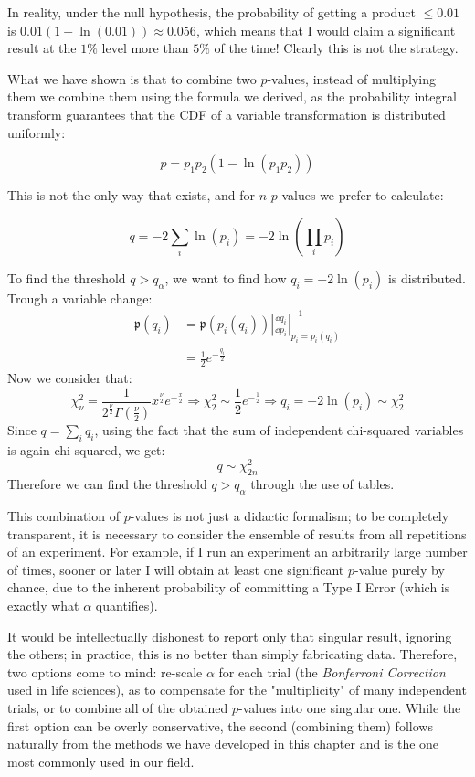 In reality, under the null hypothesis, the probability of getting a product $\leq 0.01$ is $0.01(1 - \ln(0.01)) \approx 0.056$, which means that I would claim a significant result at the $1\%$ level more than $5\%$ of the time! Clearly this is not the strategy.

What we have shown is that to combine two $p$-values, instead of multiplying them we combine them using the formula we derived, as the probability integral transform guarantees that the CDF of a variable transformation is distributed uniformly:

	\[
	p = p_1p_2 (1 - \ln(p_1p_2))
	\tag{Combination of two $p$-values}
	\]
	

This is not the only way that exists, and for $n$ $p$-values we prefer to calculate:

	\[
	q=-2\sum_i\ln\left(p_i\right) = -2\ln\left(\prod_i p_i\right)
	\]

To find the threshold $q>q_\alpha$, we want to find how $q_i=-2\ln\left(p_i\right)$ is distributed. Trough a variable change:
\begin{align*}
	\mathfrak{p}(q_i)&=\mathfrak{p}(p_i(q_i))\left|\frac{\dd q_i}{\dd p_i}\right|^{-1}_{p_i=p_i(q_i)}\\
	&=\frac{1}{2}e^{-\frac{q_i}{2}}
\end{align*}
Now we consider that:
	\[
	\chi^2_\nu = \frac{1}{2^{\frac{\nu}{2}}\Gamma\left(\frac{\nu}{2}\right)}x^{\frac{\nu}{2}}e^{-\frac{x}{2}} \Rightarrow \chi_2^2 \sim \frac{1}{2}e^{-\frac{1}{2}} \Rightarrow q_i=-2\ln\left(p_i\right) \sim \chi_2^2
	\]
Since $q=\sum_iq_i$, using the fact that the sum of independent chi-squared variables is again chi-squared, we get:
\[
	q\sim\chi^2_{2n}
\]
Therefore we can find the threshold $q>q_\alpha$ through the use of tables.

This combination of $p$-values is not just a didactic formalism; to be completely transparent, it is necessary to consider the ensemble of results from all repetitions of an experiment. For example, if I run an experiment an arbitrarily large number of times, sooner or later I will obtain at least one significant $p$-value purely by chance, due to the inherent probability of committing a Type I Error (which is exactly what $\alpha$ quantifies). 

It would be intellectually dishonest to report only that singular result, ignoring the others; in practice, this is no better than simply fabricating data. Therefore, two options come to mind: re-scale $\alpha$ for each trial (the \emph{Bonferroni Correction} used in life sciences), as to compensate for the "multiplicity" of many independent trials, or to combine all of the obtained $p$-values into one singular one. While the first option can be overly conservative, the second (combining them) follows naturally from the methods we have developed in this chapter and is the one most commonly used in our field.

